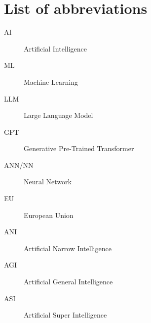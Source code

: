 \section*{List of abbreviations}

\begin{description}
    \item[AI] Artificial Intelligence
\end{description}

\begin{description}
    \item[ML] Machine Learning
\end{description}

\begin{description}
    \item[LLM] Large Language Model
\end{description}

\begin{description}
    \item[GPT] Generative Pre-Trained Transformer
\end{description}

\begin{description}
    \item[ANN/NN] Neural Network 
\end{description}

\begin{description}
    \item[EU] European Union 
\end{description}

\begin{description}
    \item[ANI] Artificial Narrow Intelligence 
\end{description}

\begin{description}
    \item[AGI] Artificial General Intelligence 
\end{description}

\begin{description}
    \item[ASI] Artificial Super Intelligence
\end{description}